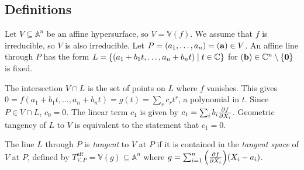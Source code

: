 \subsection{Definitions}
Let \( V \subseteq \mathbb A^n \) be an affine hypersurface, so \( V = \mathbb V(f) \).
We assume that \( f \) is irreducible, so \( V \) is also irreducible.
Let \( P = (a_1, \dots, a_n) = (\vb a) \in V \).
An affine line through \( P \) has the form \( L = \qty{(a_1 + b_1 t, \dots, a_n + b_n t) \mid t \in \mathbb C} \) for \( (\vb b) \in \mathbb C^n \setminus \qty{\vb 0} \) is fixed.

The intersection \( V \cap L \) is the set of points on \( L \) where \( f \) vanishes.
This gives \( 0 = f(a_1 + b_1 t, \dots, a_n + b_n t) = g(t) = \sum_r c_r t^r \), a polynomial in \( t \).
Since \( P \in V \cap L \), \( c_0 = 0 \).
The linear term \( c_1 \) is given by \( c_1 = \sum_i b_i \pdv{f}{X_i}(\vb a) \).
Geometric tangency of \( L \) to \( V \) is equivalent to the statement that \( c_1 = 0 \).
\begin{definition}
    The line \( L \) through \( P \) is \emph{tangent} to \( V \) at \( P \) if it is contained in the \emph{tangent space} of \( V \) at \( P \), defined by \( T_{V,P}^{\mathrm{aff}} = \mathbb V(g) \subseteq \mathbb A^n \) where \( g = \sum_{i=1}^n \qty(\pdv{f}{X_i}(P))(X_i - a_i) \).
\end{definition}
